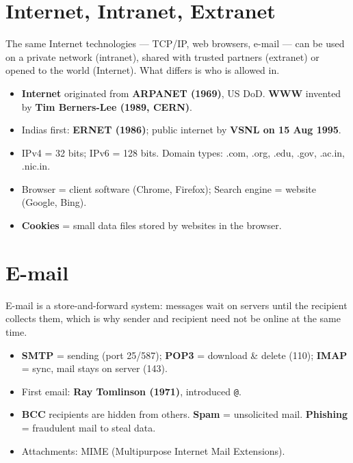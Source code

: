 \endgroup

\needspace{125pt}

\hypertarget{p1-08--3-internet-intranet-extranet}{%
\section{Internet, Intranet, Extranet}\label{p1-08--3-internet-intranet-extranet}}

The same Internet technologies --- TCP/IP, web browsers, e-mail --- can be used on a private network
(intranet), shared with trusted partners (extranet) or opened to the world (Internet). What differs is who
is allowed in.



\begin{itemize}
\tightlist
\item
  \textbf{Internet} originated from \textbf{ARPANET (1969)}, US DoD. \textbf{WWW} invented by \textbf{Tim Berners-Lee (1989, CERN)}.
\item
  India\textquotesingle s first: \textbf{ERNET (1986)}; public internet by \textbf{VSNL on 15 Aug 1995}.
\item
  IPv4 = 32 bits; IPv6 = 128 bits. Domain types: .com, .org, .edu, .gov, .ac.in, .nic.in.
\item
  Browser = client software (Chrome, Firefox); Search engine = website (Google, Bing).
\item
  \textbf{Cookies} = small data files stored by websites in the browser.
\end{itemize}

\needspace{125pt}

\hypertarget{p1-08--4-e-mail}{%
\section{E-mail}\label{p1-08--4-e-mail}}

E-mail is a store-and-forward system: messages wait on servers until the recipient collects them, which is
why sender and recipient need not be online at the same time.



\begin{itemize}
\tightlist
\item
  \textbf{SMTP} = sending (port 25/587); \textbf{POP3} = download \& delete (110); \textbf{IMAP} = sync, mail stays on server (143).
\item
  First email: \textbf{Ray Tomlinson (1971)}, introduced \texttt{@}.
\item
  \textbf{BCC} recipients are hidden from others. \textbf{Spam} = unsolicited mail. \textbf{Phishing} = fraudulent mail to steal data.
\item
  Attachments: MIME (Multipurpose Internet Mail Extensions).
\end{itemize}

